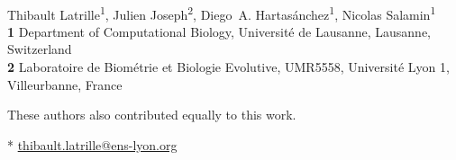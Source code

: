 \documentclass[10pt,letterpaper]{article}
\begin{document}
\vspace*{0.2in}

\begin{flushleft}
{\Large
\textbf{} %
}
\newline
\\
Thibault {Latrille}\textsuperscript{1\ddag*},
Julien {Joseph}\textsuperscript{2\ddag},
Diego~A. {Hartasánchez}\textsuperscript{1},
Nicolas {Salamin}\textsuperscript{1}
\\
\bigskip
\textbf{1} Department of Computational Biology, Université de Lausanne, Lausanne, Switzerland
\\
\textbf{2} Laboratoire de Biométrie et Biologie Evolutive, UMR5558, Université Lyon 1, Villeurbanne, France
\\

\bigskip

%
%

\ddag These authors also contributed equally to this work.



* \href{mailto:thibault.latrille@ens-lyon.org}{thibault.latrille@ens-lyon.org}

\end{flushleft}
\end{document}
